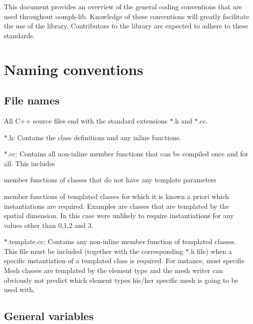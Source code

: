 This document provides an overview of the general coding conventions that are used throughout {\ttfamily oomph-\/lib}. Knowledge of these conventions will greatly facilitate the use of the library. Contributors to the library are expected to adhere to these standards.



 

\hypertarget{index_naming}{}\section{Naming conventions}\label{index_naming}
\hypertarget{index_filenames}{}\subsection{File names}\label{index_filenames}
All C++ source files end with the standard extensions $\ast$.h and $\ast$.cc.


\begin{DoxyItemize}
\item {\ttfamily $\ast$}.h\+: Contains the class definitions and any inline functions.
\item {\ttfamily $\ast$}.cc\+: Contains all non-\/inline member functions that can be compiled once and for all. This includes
\begin{DoxyItemize}
\item member functions of classes that do not have any template parameters
\item member functions of templated classes for which it is known a priori which instantiations are required. Examples are classes that are templated by the spatial dimension. In this case we\textquotesingle{}re unlikely to require instantiations for any values other than 0,1,2 and 3.
\end{DoxyItemize}
\item {\ttfamily $\ast$}.template.\+cc\+: Contains any non-\/inline member function of templated classes. This file must be included (together with the corresponding {\ttfamily $\ast$}.h file) when a specific instantiation of a templated class is required. For instance, most specific {\ttfamily Mesh} classes are templated by the element type and the mesh writer can obviously not predict which element types his/her specific mesh is going to be used with.
\end{DoxyItemize}\hypertarget{index_variables}{}\subsection{General variables}\label{index_variables}

